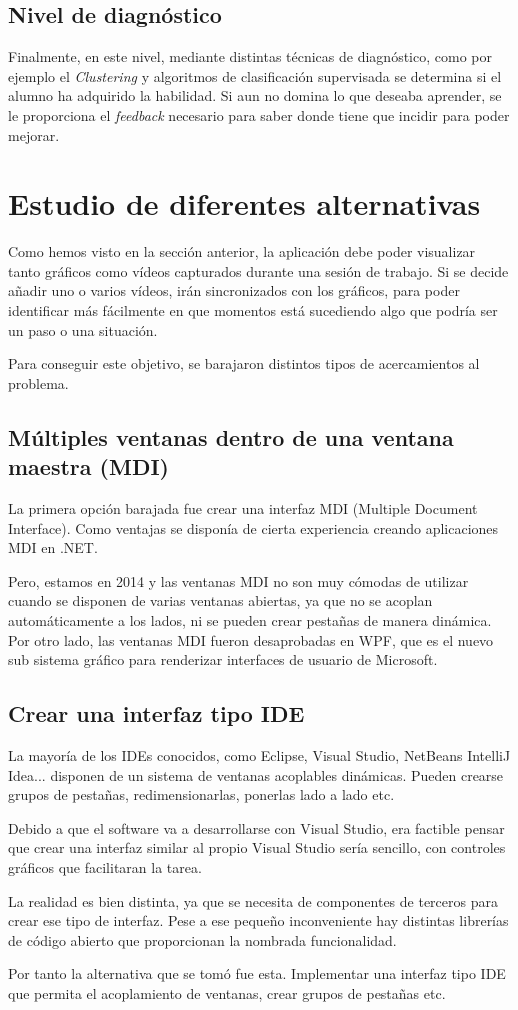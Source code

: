 \subsection{Nivel de diagn\'ostico}
Finalmente, en este nivel, mediante distintas t\'ecnicas de diagn\'ostico, como por ejemplo el \emph{Clustering} y
algoritmos de clasificaci\'on supervisada se determina si el alumno ha 
adquirido la habilidad. Si aun no domina lo que deseaba aprender, se le 
proporciona el \emph{feedback} 
necesario para saber donde tiene que incidir para poder mejorar.

\section{Estudio de diferentes alternativas}
Como hemos visto en la secci\'on anterior, la aplicaci\'on debe poder visualizar tanto gr\'aficos como 
v\'ideos capturados durante una sesi\'on de trabajo. Si se decide a\~nadir uno o varios v\'ideos, ir\'an
sincronizados con los gr\'aficos, para poder identificar m\'as f\'acilmente en que momentos est\'a sucediendo
algo que podr\'ia ser un paso o una situaci\'on.

Para conseguir este objetivo, se barajaron distintos tipos de acercamientos al problema.

\subsection{M\'ultiples ventanas dentro de una ventana maestra (MDI)}
La primera opci\'on barajada fue crear una interfaz MDI (Multiple Document Interface). Como ventajas se
dispon\'ia de cierta experiencia creando aplicaciones MDI en .NET.

Pero, estamos en 2014 y las ventanas MDI no son muy c\'omodas de utilizar cuando se disponen de varias ventanas
abiertas, ya que no se acoplan autom\'aticamente a los lados, ni se pueden crear pesta\~nas de manera din\'amica.
Por otro lado, las ventanas MDI fueron desaprobadas en WPF, que es el nuevo sub sistema gr\'afico para renderizar 
interfaces de usuario de Microsoft.

\subsection{Crear una interfaz tipo IDE}
La mayor\'ia de los IDEs conocidos, como Eclipse, Visual Studio, NetBeans IntelliJ Idea... disponen de un sistema de 
ventanas acoplables din\'amicas. Pueden crearse grupos de pesta\~nas, redimensionarlas, ponerlas lado a lado etc.

Debido a que el software va a desarrollarse con Visual Studio, era factible pensar que crear una interfaz similar al propio
Visual Studio ser\'ia sencillo, con controles gr\'aficos que facilitaran la tarea.

La realidad es bien distinta, ya que se necesita de componentes de terceros para crear ese tipo de interfaz. Pese a ese
peque\~no inconveniente hay distintas librer\'ias de c\'odigo abierto que proporcionan la nombrada funcionalidad.

Por tanto la alternativa que se tom\'o fue esta. Implementar una interfaz tipo IDE que permita el acoplamiento de ventanas,
crear grupos de pesta\~nas etc.